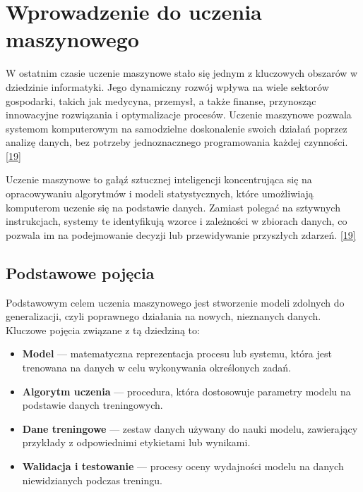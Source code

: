 \documentclass[12pt,a4paper,twoside, inzynierska]{pwr_wmat_praca_dyplomowa}
\theoremstyle{plain}
\numberwithin{theorem}{chapter}
\theoremstyle{definition}
\numberwithin{theorem}{chapter}
\begin{document}
	\section{Wprowadzenie do uczenia maszynowego}
	W ostatnim czasie uczenie maszynowe stało się jednym z kluczowych obszarów w dziedzinie informatyki. Jego dynamiczny rozwój wpływa na wiele sektorów gospodarki, takich jak medycyna, przemysł, a także finanse, przynosząc innowacyjne rozwiązania i optymalizacje procesów. Uczenie maszynowe pozwala systemom komputerowym na samodzielne doskonalenie swoich działań poprzez analizę danych, bez potrzeby jednoznacznego programowania każdej czynności. \hyperref[info19]{[19]}
	
	Uczenie maszynowe to gałąź sztucznej inteligencji koncentrująca się na opracowywaniu algorytmów i modeli statystycznych, które umożliwiają komputerom uczenie się na podstawie danych. Zamiast polegać na sztywnych instrukcjach, systemy te identyfikują wzorce i zależności w zbiorach danych, co pozwala im na podejmowanie decyzji lub przewidywanie przyszłych zdarzeń. \hyperref[info19]{[19]}
	
	\subsection{Podstawowe pojęcia}
	
	Podstawowym celem uczenia maszynowego jest stworzenie modeli zdolnych do generalizacji, czyli poprawnego działania na nowych, nieznanych danych. Kluczowe pojęcia związane z tą dziedziną to:
	
	\begin{itemize} 
		\item \textbf{Model} — matematyczna reprezentacja procesu lub systemu, która jest trenowana na danych w celu wykonywania określonych zadań. 
		\item \textbf{Algorytm uczenia} — procedura, która dostosowuje parametry modelu na podstawie danych treningowych. 
		\item \textbf{Dane treningowe} — zestaw danych używany do nauki modelu, zawierający przykłady z odpowiednimi etykietami lub wynikami. 
		\item \textbf{Walidacja i testowanie} — procesy oceny wydajności modelu na danych niewidzianych podczas treningu. 
	\end{itemize}
	
\end{document}
